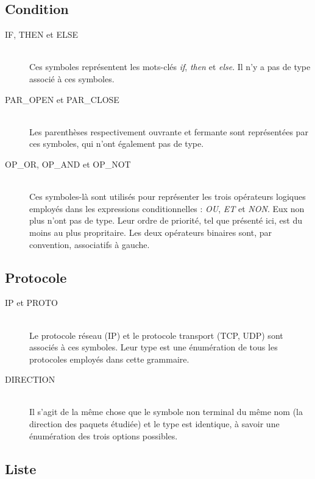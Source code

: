 \documentclass[a4paper,11pt]{report}
\begin{document}
\subsection{Condition}

\begin{description}
  \item[IF, THEN et ELSE]~\\
    Ces symboles représentent les mots-clés \emph{if}, \emph{then} et
    \emph{else}. Il n'y a pas de type associé à ces symboles.

  \item[PAR\_OPEN et PAR\_CLOSE]~\\
    Les parenthèses respectivement ouvrante et fermante sont représentées par
    ces symboles, qui n'ont également pas de type.

  \item[OP\_OR, OP\_AND et OP\_NOT]~\\
    Ces symboles-là sont utilisés pour représenter les trois opérateurs
    logiques employés dans les expressions conditionnelles : \emph{OU},
    \emph{ET} et \emph{NON}. Eux non plus n'ont pas de type. Leur ordre
    de priorité, tel que présenté ici, est du moins au plus propritaire. Les
    deux opérateurs binaires sont, par convention, associatifs à gauche.
\end{description}

\subsection{Protocole}

\begin{description}
  \item[IP et PROTO]~\\
    Le protocole réseau (IP) et le protocole transport (TCP, UDP) sont
    associés à ces symboles. Leur type est une énumération de tous les
    protocoles employés dans cette grammaire.

  \item[DIRECTION]~\\
    Il s'agit de la même chose que le symbole non terminal du même nom (la
    direction des paquets étudiée) et le type est identique, à savoir une
    énumération des trois options possibles.
\end{description}

\subsection{Liste}
\end{document}
